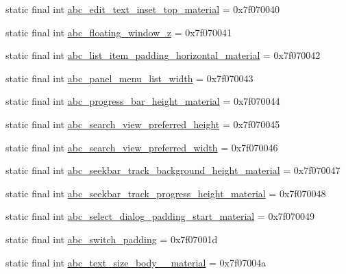 \begin{CompactItemize}
\item 
static final int \hyperlink{classandroid_1_1support_1_1fragment_1_1_r_1_1dimen_2a56643069ce078ccb56f0d95f21296e}{abc\_\-edit\_\-text\_\-inset\_\-top\_\-material} = 0x7f070040
\item 
static final int \hyperlink{classandroid_1_1support_1_1fragment_1_1_r_1_1dimen_5c6b5c53e264da7eb74c3f249be86b77}{abc\_\-floating\_\-window\_\-z} = 0x7f070041
\item 
static final int \hyperlink{classandroid_1_1support_1_1fragment_1_1_r_1_1dimen_53164c05ca686c0d466b09d860253462}{abc\_\-list\_\-item\_\-padding\_\-horizontal\_\-material} = 0x7f070042
\item 
static final int \hyperlink{classandroid_1_1support_1_1fragment_1_1_r_1_1dimen_430d10196343beca938c3ea5b130be1d}{abc\_\-panel\_\-menu\_\-list\_\-width} = 0x7f070043
\item 
static final int \hyperlink{classandroid_1_1support_1_1fragment_1_1_r_1_1dimen_8c41a8177305b4eb11f4be9f02c86d04}{abc\_\-progress\_\-bar\_\-height\_\-material} = 0x7f070044
\item 
static final int \hyperlink{classandroid_1_1support_1_1fragment_1_1_r_1_1dimen_b6495dad930af337d71af34ac5ca0cfd}{abc\_\-search\_\-view\_\-preferred\_\-height} = 0x7f070045
\item 
static final int \hyperlink{classandroid_1_1support_1_1fragment_1_1_r_1_1dimen_c3641d172c0723fc8212a78633443a46}{abc\_\-search\_\-view\_\-preferred\_\-width} = 0x7f070046
\item 
static final int \hyperlink{classandroid_1_1support_1_1fragment_1_1_r_1_1dimen_95634f02c647af45e7b51cb73284d109}{abc\_\-seekbar\_\-track\_\-background\_\-height\_\-material} = 0x7f070047
\item 
static final int \hyperlink{classandroid_1_1support_1_1fragment_1_1_r_1_1dimen_634fc16fc650186d608c81d9bd725f2f}{abc\_\-seekbar\_\-track\_\-progress\_\-height\_\-material} = 0x7f070048
\item 
static final int \hyperlink{classandroid_1_1support_1_1fragment_1_1_r_1_1dimen_8c09725d7b71f00ed0317bb94459f87c}{abc\_\-select\_\-dialog\_\-padding\_\-start\_\-material} = 0x7f070049
\item 
static final int \hyperlink{classandroid_1_1support_1_1fragment_1_1_r_1_1dimen_148d24fbdca7b070408fadc8b66539a6}{abc\_\-switch\_\-padding} = 0x7f07001d
\item 
static final int \hyperlink{classandroid_1_1support_1_1fragment_1_1_r_1_1dimen_40989aba7149f86bc4d60c7d139e45b8}{abc\_\-text\_\-size\_\-body\_\_\-material} = 0x7f07004a

\end{CompactItemize}
